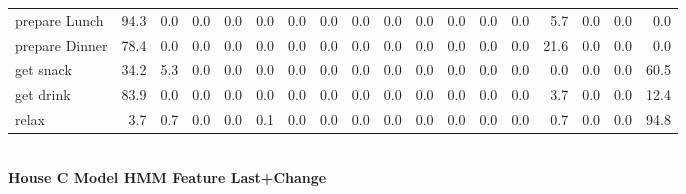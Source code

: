 \documentclass{article}
\begin{document}
\begin{sideways}
\begin{tabular}{lrrrrrrrrrrrrrrrrr}
prepare Lunch         &        94.3 &                0.0 &           0.0 &                          0.0 &                0.0 &                0.0 &                        0.0 &          0.0 &              0.0 &                0.0 &                    0.0 &                      0.0 &                  0.0 &                   5.7 &              0.0 &              0.0 &          0.0 \\
prepare Dinner        &        78.4 &                0.0 &           0.0 &                          0.0 &                0.0 &                0.0 &                        0.0 &          0.0 &              0.0 &                0.0 &                    0.0 &                      0.0 &                  0.0 &                  21.6 &              0.0 &              0.0 &          0.0 \\
get snack             &        34.2 &                5.3 &           0.0 &                          0.0 &                0.0 &                0.0 &                        0.0 &          0.0 &              0.0 &                0.0 &                    0.0 &                      0.0 &                  0.0 &                   0.0 &              0.0 &              0.0 &         60.5 \\
get drink             &        83.9 &                0.0 &           0.0 &                          0.0 &                0.0 &                0.0 &                        0.0 &          0.0 &              0.0 &                0.0 &                    0.0 &                      0.0 &                  0.0 &                   3.7 &              0.0 &              0.0 &         12.4 \\
relax                 &         3.7 &                0.7 &           0.0 &                          0.0 &                0.1 &                0.0 &                        0.0 &          0.0 &              0.0 &                0.0 &                    0.0 &                      0.0 &                  0.0 &                   0.7 &              0.0 &              0.0 &         94.8 \\
\bottomrule
\end{tabular}
\end{sideways}
\normalsize
\vspace{1cm}\\
\textbf{House C Model HMM Feature Last+Change}\\
\vspace{1cm}\\
\end{document}
